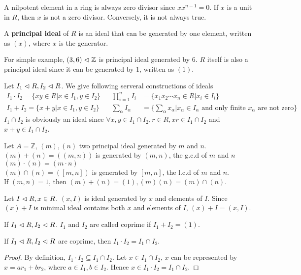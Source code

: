 \documentclass{amsart}
\begin{document}
\begin{rem}
	A nilpotent element in a ring is always zero divisor since $x x^{n-1}=0$. If $x$ is a unit in $R$, then $x$ is not a zero divisor. Conversely, it is not always true.
\end{rem}

\begin{secdefn}
	A \textbf{principal ideal} of $R$ is an ideal that can be generated by one element, written as $(x)$, where $x$ is the generator.
\end{secdefn}
For simple example, $(3,6) \vartriangleleft \mathbb{Z}$ is principal ideal generated by 6. $R$ itself is also a principal ideal since it can be generated by 1, written as $(1)$.

Let $I_1 \vartriangleleft R, I_2 \vartriangleleft R$. We give following serveral constructions of ideals
\[
\begin{aligned}
I_1 \cdot I_2 = \{ xy \in R| x \in I_1, y \in I_2\}& & \prod_{i=1}^{n} I_i &= \{ x_1 x_2 \cdots x_n \in R| x_i \in I_i\}&\\
I_1 + I_2 = \{x+y| x\in I_1, y \in I_2 \}& & \sum_{\alpha}I_\alpha &= \{\sum_{\alpha} x_\alpha | x_\alpha \in I_\alpha \text{ and only finite }x_\alpha \text{ are not zero} \}&
\end{aligned}
\]
$I_1 \cap I_2$ is obviously an ideal since $\forall x, y \in I_1 \cap I_2, r\in R, xr \in I_1 \cap I_2$ and $x+y \in I_1 \cap I_2$.

\begin{ex}
	Let $A= \mathbb{Z}$, $(m),(n)$ two principal ideal generated by $m$ and $n$.\\
	$(m)+(n) = ((m,n))$ is generated by $(m,n)$, the g.c.d of $m$ and $n$\\
	$(m)\cdot(n) = (m\cdot n)$\\
	$(m) \cap (n) =([m,n])$ is generated by $[m,n]$, the l.c.d of $m$ and $n$.\\
	If $(m,n)=1$, then $(m)+(n)=(1), (m)(n)=(m)\cap(n)$.
\end{ex}
Let $I \vartriangleleft R , x\in R$. $(x,I)$ is ideal generated by $x$ and elements of $I$. Since $(x)+I$ is minimal ideal contains both $x$ and elements of $I$, $(x)+I =(x,I)$.
\begin{secdefn}
	If $I_1 \vartriangleleft R, I_2 \vartriangleleft R$. $I_1$ and $I_2$ are called coprime if $I_1 + I_2 = (1)$.
\end{secdefn}

\begin{secprop}
	\label{prop1}
	If $I_1 \vartriangleleft R, I_2 \vartriangleleft R$ are coprime, then $I_1 \cdot I_2 = I_1 \cap I_2$.
\end{secprop}
\begin{proof}
	By definition, $I_1 \cdot I_2 \subseteq I_1 \cap I_2$. Let $x \in I_1 \cap I_2$, $x$ can be represented by $x=ar_1 +b r_2$, where $a \in I_1, b\in I_2$. Hence $x \in I_1 \cdot I_2= I_1 \cap I_2$.
\end{proof}
\end{document}
